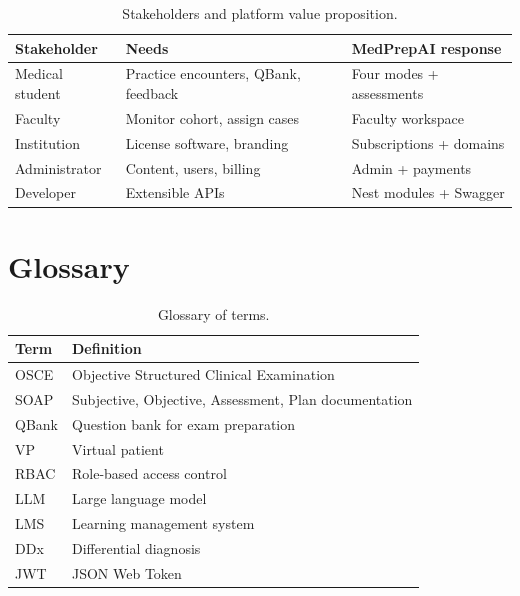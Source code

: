 \begin{table}[htbp]
  \centering
  \caption{Stakeholders and platform value proposition.}
  \label{tab:stakeholders}
  \small
  \begin{tabular}{@{}p{2.8cm}p{5.5cm}p{5.7cm}@{}}
    \toprule
    \textbf{Stakeholder} & \textbf{Needs} & \textbf{MedPrepAI response} \\
    \midrule
    Medical student & Practice encounters, QBank, feedback & Four modes + assessments \\
    Faculty & Monitor cohort, assign cases & Faculty workspace \\
    Institution & License software, branding & Subscriptions + domains \\
    Administrator & Content, users, billing & Admin + payments \\
    Developer & Extensible APIs & Nest modules + Swagger \\
    \bottomrule
  \end{tabular}
\end{table}

\chapter{Glossary}
\label{app:glossary}

\begin{table}[htbp]
  \centering
  \caption{Glossary of terms.}
  \begin{tabular}{@{}lp{9.5cm}@{}}
    \toprule
    \textbf{Term} & \textbf{Definition} \\
    \midrule
    OSCE & Objective Structured Clinical Examination \\
    SOAP & Subjective, Objective, Assessment, Plan documentation \\
    QBank & Question bank for exam preparation \\
    VP & Virtual patient \\
    RBAC & Role-based access control \\
    LLM & Large language model \\
    LMS & Learning management system \\
    DDx & Differential diagnosis \\
    JWT & JSON Web Token \\
    \bottomrule
  \end{tabular}
\end{table}
